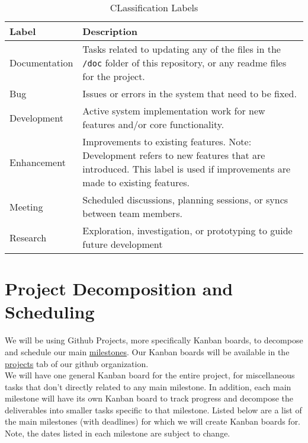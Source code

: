 \documentclass{article}
\begin{document}
\begin{table}[h!]
\centering
\begin{tabularx}{\textwidth}{|l|X|}
\hline
\textbf{Label} & \textbf{Description} \\ \hline
Documentation & Tasks related to updating any of the files in the \texttt{/doc}
folder of this repository, or any readme files for the project. \\ \hline
Bug & Issues or errors in the system that need to be fixed. \\ \hline
Development & Active system implementation work for new features and/or core
functionality. \\ \hline
Enhancement & Improvements to existing features. Note: Development refers to new
features that are introduced. This label is used if improvements are made to
existing features. \\ \hline
Meeting & Scheduled discussions, planning sessions, or syncs between team
members. \\ \hline
Research & Exploration, investigation, or prototyping to guide future
development \\ \hline
\end{tabularx}
\caption{CLassification Labels}
\end{table}



\section{Project Decomposition and Scheduling}

We will be using Github Projects, more specifically Kanban boards, to decompose
and schedule our main
\href{https://github.com/Team6-SixSense/audio360/milestones}{milestones}. Our
Kanban boards will be available in the
\href{https://github.com/orgs/Team6-SixSense/projects}{projects} tab of our
github organization. \\

We will have one general Kanban board for the entire project, for miscellaneous
tasks that don't directly related to any main milestone. In addition, each main
milestone will have its own Kanban board to track progress and decompose the
deliverables into smaller tasks specific to that milestone. Listed below are a
list of the main milestones (with deadlines) for which we will create Kanban
boards for. Note, the dates listed in each milestone are subject to change.
\end{document}
